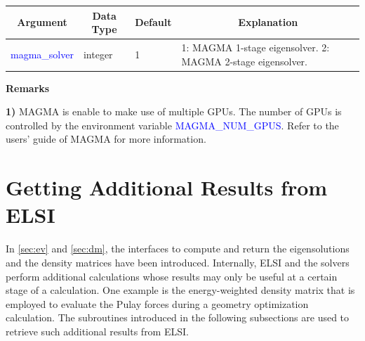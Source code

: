 \documentclass{report}
\newcommand{\tcb}[1]{\textcolor{blue}{#1}}
\begin{document}
\begin{tabular}[]{|p{30mm}|p{20mm}|p{15mm}|p{100mm}|}
\hline
\multicolumn{1}{|c|}{\textbf{Argument}} & \multicolumn{1}{c|}{\textbf{Data Type}} & \multicolumn{1}{c|}{\textbf{Default}} & \multicolumn{1}{c|}{\textbf{Explanation}}\\
\hline
\tcb{magma\_solver} & integer & 1 & 1: MAGMA 1-stage eigensolver. 2: MAGMA 2-stage eigensolver.\\
\hline
\end{tabular}

\textbf{Remarks}

\textbf{1)} MAGMA is enable to make use of multiple GPUs. The number of GPUs is controlled by the environment variable \tcb{MAGMA\_NUM\_GPUS}. Refer to the users' guide of MAGMA for more information.

\section{Getting Additional Results from ELSI}
\label{sec:getter}
In \ref{sec:ev} and \ref{sec:dm}, the interfaces to compute and return the eigensolutions and the density matrices have been introduced. Internally, ELSI and the solvers perform additional calculations whose results may only be useful at a certain stage of a calculation. One example is the energy-weighted density matrix that is employed to evaluate the Pulay forces during a geometry optimization calculation. The subroutines introduced in the following subsections are used to retrieve such additional results from ELSI.
\end{document}

